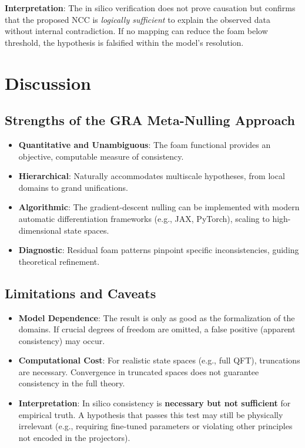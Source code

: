 \documentclass[11pt,a4paper]{article}
\begin{document}
\textbf{Interpretation}: The in silico verification does not prove causation but confirms that the proposed NCC is \emph{logically sufficient} to explain the observed data without internal contradiction. If no mapping can reduce the foam below threshold, the hypothesis is falsified within the model's resolution.

\section{Discussion}

\subsection{Strengths of the GRA Meta-Nulling Approach}
\begin{itemize}
    \item \textbf{Quantitative and Unambiguous}: The foam functional provides an objective, computable measure of consistency.
    \item \textbf{Hierarchical}: Naturally accommodates multiscale hypotheses, from local domains to grand unifications.
    \item \textbf{Algorithmic}: The gradient-descent nulling can be implemented with modern automatic differentiation frameworks (e.g., JAX, PyTorch), scaling to high-dimensional state spaces.
    \item \textbf{Diagnostic}: Residual foam patterns pinpoint specific inconsistencies, guiding theoretical refinement.
\end{itemize}

\subsection{Limitations and Caveats}
\begin{itemize}
    \item \textbf{Model Dependence}: The result is only as good as the formalization of the domains. If crucial degrees of freedom are omitted, a false positive (apparent consistency) may occur.
    \item \textbf{Computational Cost}: For realistic state spaces (e.g., full QFT), truncations are necessary. Convergence in truncated spaces does not guarantee consistency in the full theory.
    \item \textbf{Interpretation}: In silico consistency is \textbf{necessary but not sufficient} for empirical truth. A hypothesis that passes this test may still be physically irrelevant (e.g., requiring fine-tuned parameters or violating other principles not encoded in the projectors).
\end{itemize}
\end{document}
